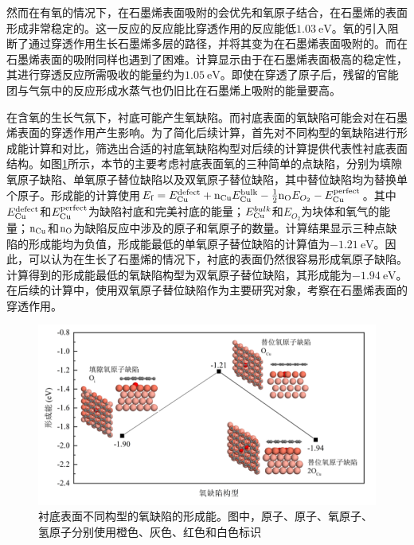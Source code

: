 然而在有氧的情况下，在石墨烯表面吸附的会优先和氧原子结合，在石墨烯的表面形成非常稳定的。这一反应的反应能比穿透作用的反应能低$\SI{1.03}{\electronvolt}$。氧的引入阻断了通过穿透作用生长石墨烯多层的路径，并将其变为在石墨烯表面吸附的。而在石墨烯表面的吸附同样也遇到了困难。计算显示由于在石墨烯表面极高的稳定性，其进行穿透反应所需吸收的能量约为$\SI{1.05}{\electronvolt}$。即使在穿透了原子后，残留的官能团与气氛中的反应形成水蒸气也仍旧比在石墨烯上吸附的能量要高。

在含氧的生长气氛下，衬底可能产生氧缺陷。而衬底表面的氧缺陷可能会对在石墨烯表面的穿透作用产生影响。为了简化后续计算，首先对不同构型的氧缺陷进行形成能计算和对比，筛选出合适的衬底氧缺陷构型对后续的计算提供代表性衬底表面结构。如图\ref{fig:FLG_DFT_Odefect}所示，本节的主要考虑衬底表面氧的三种简单的点缺陷，分别为\chinesecolon 填隙氧原子缺陷、单氧原子替位缺陷以及双氧原子替位缺陷，其中替位缺陷均为替换单个原子。形成能的计算使用$E_{\rm f}=E_{\rm Cu}^{\rm defect}+{\rm n_{Cu}}E_{\rm Cu}^{\rm bulk}-\frac{1}{2}{\rm n_{O}}E_{O_{2}} - E_{\rm Cu}^{\rm perfect}$。其中$E_{\rm Cu}^{\rm defect}$和$E_{\rm Cu}^{\rm perfect}$为缺陷衬底和完美衬底的能量；$E_{\rm Cu}^{bulk}$和$E_{O_{2}}$为块体和氧气的能量；${\rm n_{Cu}}$和${\rm n_{O}}$为缺陷反应中涉及的原子和氧原子的数量。计算结果显示三种点缺陷的形成能均为负值，形成能最低的单氧原子替位缺陷的计算值为$\SI{-1.21}{\electronvolt}$。因此，可以认为在生长了石墨烯的情况下，衬底的表面仍然很容易形成氧原子缺陷。计算得到的形成能最低的氧缺陷构型为双氧原子替位缺陷，其形成能为$\SI{-1.94}{\electronvolt}$。在后续的计算中，使用双氧原子替位缺陷作为主要研究对象，考察在石墨烯表面的穿透作用。


\begin{figure}[htb]
    \includegraphics{pic/FLG_DFT_Odefect.png}
    \caption{衬底表面不同构型的氧缺陷的形成能。图中，原子、原子、氧原子、氢原子分别使用橙色、灰色、红色和白色标识}
    \label{fig:FLG_DFT_Odefect}
\end{figure}

